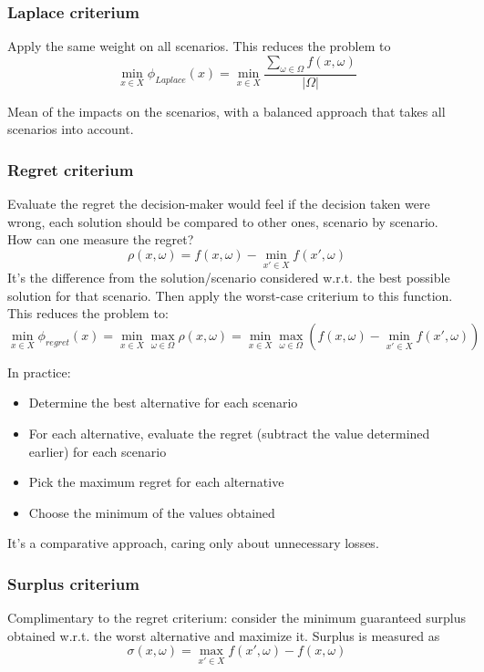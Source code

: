 \subsubsection{Laplace criterium}

Apply the same weight on all scenarios. This reduces the problem to
$$ \min_{x \in X} \phi_{Laplace} (x) = \min_{x \in X} \frac{\sum_{\omega \in \Omega} f (x, \omega)}{|\Omega|} $$

Mean of the impacts on the scenarios, with a balanced approach that takes all scenarios into account.

\subsubsection{Regret criterium}

Evaluate the regret the decision-maker would feel if the decision taken were wrong, each solution should be compared to other ones, scenario by scenario. How can one measure the regret? 
$$ \rho (x, \omega) = f(x, \omega) - \min_{x' \in X} f (x', \omega) $$
It's the difference from the solution/scenario considered w.r.t. the best possible solution for that scenario. Then apply the worst-case criterium to this function. This reduces the problem to: 
$$ \min_{x \in X} \phi_{regret} (x) = \min_{x \in X} \max_{\omega \in \Omega} \rho (x, \omega) = \min_{x \in X} \max_{\omega \in \Omega} \left(f(x, \omega) - \min_{x' \in X} f(x', \omega) \right) $$

In practice: 
\begin{itemize}
	\item Determine the best alternative for each scenario
	
	\item For each alternative, evaluate the regret (subtract the value determined earlier) for each scenario
	
	\item Pick the maximum regret for each alternative
	
	\item Choose the minimum of the values obtained
\end{itemize}

It's a comparative approach, caring only about unnecessary losses.

\subsubsection{Surplus criterium}

Complimentary to the regret criterium: consider the minimum guaranteed surplus obtained w.r.t. the worst alternative and maximize it. Surplus is measured as
$$ \sigma (x, \omega) = \max_{x' \in X} f(x', \omega) - f(x, \omega) $$

